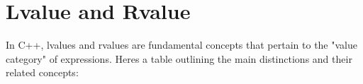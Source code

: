 \chapter{Lvalue and Rvalue}
\hypertarget{md_docs_2own__docs_2cpp__fudamentals_2lvalue__and__rvalue}{}\label{md_docs_2own__docs_2cpp__fudamentals_2lvalue__and__rvalue}
\label{md_docs_2own__docs_2cpp__fudamentals_2lvalue__and__rvalue_autotoc_md122}%
%

\begin{DoxyItemize}
\item In C++, lvalues and rvalues are fundamental concepts that pertain to the "{}value category"{} of expressions. Here\textquotesingle{}s a table outlining the main distinctions and their related concepts\+:
\end{DoxyItemize}

